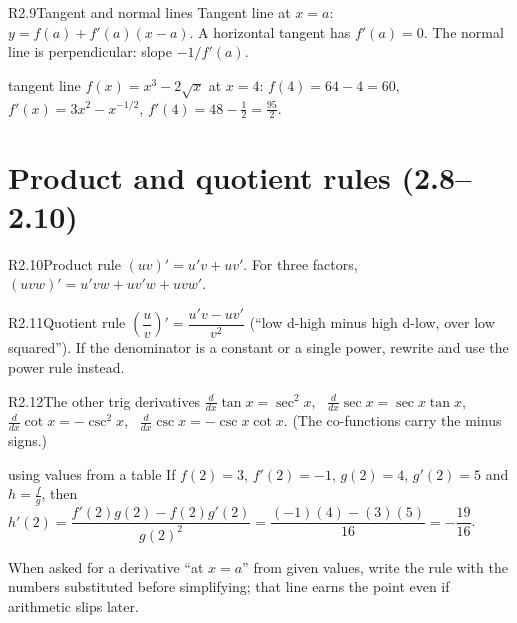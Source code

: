 \documentclass{apcalc}
\begin{document}
\begin{rulebox}{R2.9}{Tangent and normal lines}
Tangent line at $x=a$: $y=f(a)+f'(a)(x-a)$. A horizontal tangent has $f'(a)=0$. The normal line is perpendicular: slope $-1/f'(a)$.
\end{rulebox}

\begin{example}{tangent line}
$f(x)=x^3-2\sqrt x$ at $x=4$: $f(4)=64-4=60$, $f'(x)=3x^2-x^{-1/2}$, $f'(4)=48-\frac12=\frac{95}{2}$. 
\end{example}

\section{Product and quotient rules (2.8--2.10)}

\begin{rulebox}{R2.10}{Product rule}
$(uv)'=u'v+uv'$. For three factors, $(uvw)'=u'vw+uv'w+uvw'$.
\end{rulebox}

\begin{rulebox}{R2.11}{Quotient rule}
$\left(\dfrac{u}{v}\right)'=\dfrac{u'v-uv'}{v^2}$ (``low d-high minus high d-low, over low squared''). If the denominator is a constant or a single power, rewrite and use the power rule instead.
\end{rulebox}

\begin{rulebox}{R2.12}{The other trig derivatives}
$\frac{d}{dx}\tan x=\sec^2x$, \ $\frac{d}{dx}\sec x=\sec x\tan x$, \ $\frac{d}{dx}\cot x=-\csc^2x$, \ $\frac{d}{dx}\csc x=-\csc x\cot x$. (The co-functions carry the minus signs.)
\end{rulebox}

\begin{example}{using values from a table}
If $f(2)=3$, $f'(2)=-1$, $g(2)=4$, $g'(2)=5$ and $h=\frac{f}{g}$, then
$h'(2)=\dfrac{f'(2)g(2)-f(2)g'(2)}{g(2)^2}=\dfrac{(-1)(4)-(3)(5)}{16}=-\dfrac{19}{16}$. 
\end{example}

\begin{frqtip}
When asked for a derivative ``at $x=a$'' from given values, write the rule with the numbers substituted before simplifying; that line earns the point even if arithmetic slips later.
\end{frqtip}
\end{document}
